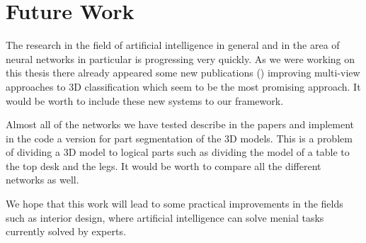 \section{Future Work}
The research in the field of artificial intelligence in general and in the area of neural networks in particular is progressing very quickly. As we were working on this thesis there already appeared some new publications (\cite{yu_multi-view_2018, you_pvnet:_2018, feng_gvcnn:_2018}) improving multi-view approaches to 3D classification which seem to be the most promising approach. It would be worth to include these new systems to our framework. \par
Almost all of the networks we have tested describe in the papers and implement in the code a version for part segmentation of the 3D models. This is a problem of dividing a 3D model to logical parts such as dividing the model of a table to the top desk and the legs. It would be worth to compare all the different networks as well.\par
We hope that this work will lead to some practical improvements in the fields such as interior design, where artificial intelligence can solve menial tasks currently solved by experts. 
